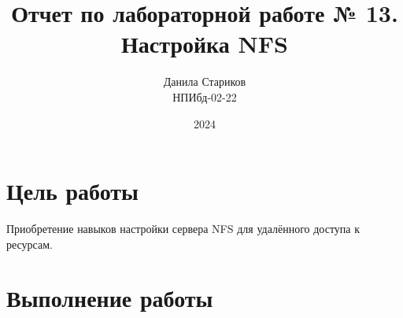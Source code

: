 

\title{Отчет по лабораторной работе № 13. \\ Настройка NFS}
\author{Данила Стариков \\ НПИбд-02-22}
\date{2024}



\maketitle
\newpage

\tableofcontents

\newpage
\section{Цель работы}
Приобретение навыков настройки сервера NFS для удалённого доступа к ресурсам.
\newpage

\section{Выполнение работы}
